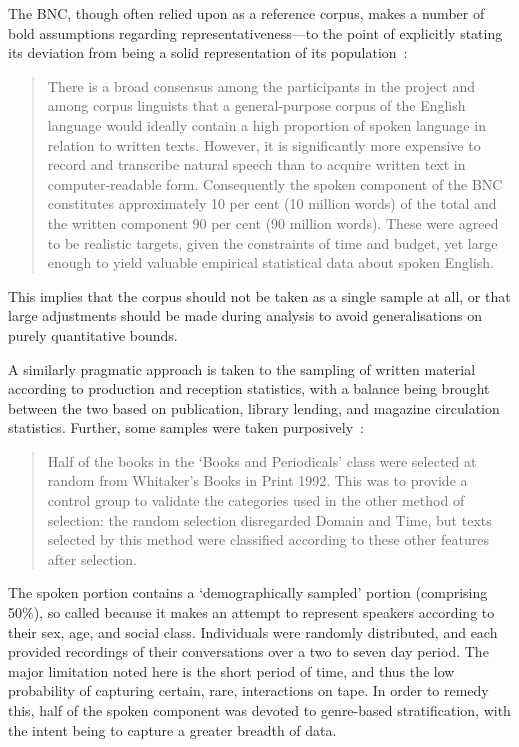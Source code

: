 

The BNC, though often relied upon as a reference corpus, makes a number of bold assumptions regarding representativeness---to the point of explicitly stating its deviation from being a solid representation of its population~\cite[p.6]{lou1995users}:

\begin{quote}
There is a broad consensus among the participants in the project and among corpus linguists that a general-purpose corpus of the English language would ideally contain a high proportion of spoken language in relation to written texts. However, it is significantly more expensive to record and transcribe natural speech than to acquire written text in computer-readable form. Consequently the spoken component of the BNC constitutes approximately 10 per cent (10 million words) of the total and the written component 90 per cent (90 million words). These were agreed to be realistic targets, given the constraints of time and budget, yet large enough to yield valuable empirical statistical data about spoken English.
\end{quote}

This implies that the corpus should not be taken as a single sample at all, or that large adjustments should be made during analysis to avoid generalisations on purely quantitative bounds.

A similarly pragmatic approach is taken to the sampling of written material according to production and reception statistics, with a balance being brought between the two based on publication, library lending, and magazine circulation statistics.  Further, some samples were taken purposively~\cite[p.10]{lou1995users}:

\begin{quote}
Half of the books in the ‘Books and Periodicals’ class were selected at random from Whitaker's Books in Print 1992. This was to provide a control group to validate the categories used in the other method of selection:  the random selection disregarded Domain and Time, but texts selected by this method were classified according to these other features after selection.
\end{quote}

The spoken portion contains a `demographically sampled' portion (comprising 50\%), so called because it makes an attempt to represent speakers according to their sex, age, and social class.  Individuals were randomly distributed, and each provided recordings of their conversations over a two to seven day period.  The major limitation noted here is the short period of time, and thus the low probability of capturing certain, rare, interactions on tape.  In order to remedy this, half of the spoken component was devoted to genre-based stratification, with the intent being to capture a greater breadth of data.


